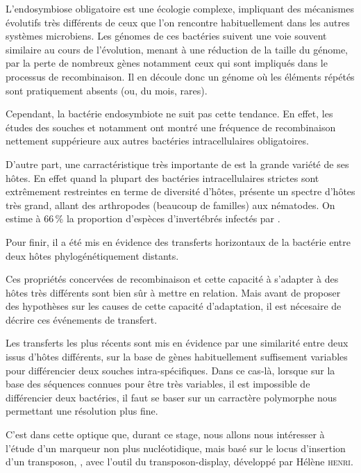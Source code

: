 L’endosymbiose obligatoire est une écologie complexe, impliquant des mécanismes évolutifs très différents de ceux que l’on rencontre habituellement dans les autres systèmes microbiens.
Les génomes de ces bactéries suivent une voie souvent similaire au cours de l’évolution, menant à une réduction de la taille du génome, par la perte de nombreux gènes\cite{wernegreen2002} notamment ceux qui sont impliqués dans le processus de recombinaison.
Il en découle donc un génome où les éléments répétés sont pratiquement absents (ou, du mois, rares\cite{Bordenstein2005}).

Cependant, la bactérie endosymbiote  ne suit pas cette tendance. En effet, les études des souches  et  notamment ont montré une fréquence de recombinaison nettement suppérieure aux autres bactéries intracellulaires obligatoires\cite{Wu2004}.

D’autre part, une carractéristique très importante de  est la grande variété de ses hôtes. En effet quand la plupart des bactéries intracellulaires strictes sont extrêmement restreintes en terme de diversité d’hôtes,  présente un spectre d’hôtes très grand, allant des arthropodes (beaucoup de familles) aux nématodes. On estime à 66\,\% la proportion d’espèces d’invertébrés infectés par \cite{hilgenboecker2008}.

Pour finir, il a été mis en évidence \cite{vavre1999} des transferts horizontaux de la bactérie entre deux hôtes phylogénétiquement distants.

Ces propriétés concervées de recombinaison et cette capacité à s’adapter à des hôtes très différents sont bien sûr à mettre en relation.
Mais avant de proposer des hypothèses sur les causes de cette capacité d’adaptation, il est nécesaire de décrire ces événements de transfert.

Les transferts les plus récents sont mis en évidence par une similarité entre deux  issus d’hôtes différents, sur la base de gènes habituellement suffisement variables pour différencier deux souches intra-spécifiques.
Dans ce cas-là, lorsque sur la base des séquences connues pour être très variables, il est impossible de différencier deux bactéries, il faut se baser sur un carractère polymorphe nous permettant une résolution plus fine.

C’est dans cette optique que, durant ce stage, nous allons nous intéresser à l’étude  d’un marqueur non plus nucléotidique, mais basé sur le locus d’insertion d’un transposon, , avec l’outil du transposon-display, développé par Hélène \textsc{henri}\cite{memHH}.
